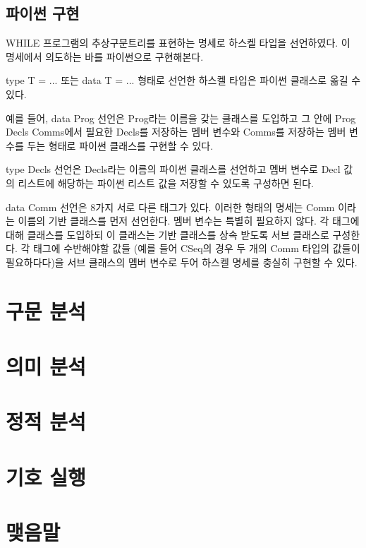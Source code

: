 \documentclass[a4paper]{book}
\begin{document}


\section{파이썬 구현}

WHILE 프로그램의 추상구문트리를 표현하는 명세로 하스켈 타입을
선언하였다. 이 명세에서 의도하는 바를 파이썬으로 구현해본다.

type T = ... 또는 data T = ... 형태로 선언한 하스켈 타입은 파이썬
클래스로 옮길 수 있다.

예를 들어, data Prog 선언은 Prog라는 이름을 갖는 클래스를 도입하고 그
안에 Prog Decls Comms에서 필요한 Decls를 저장하는 멤버 변수와 Comms를
저장하는 멤버 변수를 두는 형태로 파이썬 클래스를 구현할 수 있다.

type Decls 선언은 Decls라는 이름의 파이썬 클래스를 선언하고 멤버
변수로 Decl 값의 리스트에 해당하는 파이썬 리스트 값을 저장할 수 있도록
구성하면 된다.

data Comm 선언은 8가지 서로 다른 태그가 있다. 이러한 형태의 명세는
Comm 이라는 이름의 기반 클래스를 먼저 선언한다. 멤버 변수는 특별히
필요하지 않다. 각 태그에 대해 클래스를 도입하되 이 클래스는 기반
클래스를 상속 받도록 서브 클래스로 구성한다. 각 태그에 수반해야할 값들
(예를 들어 CSeq의 경우 두 개의 Comm 타입의 값들이 필요하다다)을 서브
클래스의 멤버 변수로 두어 하스켈 명세를 충실히 구현할 수 있다.


\chapter{구문 분석}

\chapter{의미 분석}

\chapter{정적 분석}

\chapter{기호 실행}

\chapter{맺음말}
\end{document}
